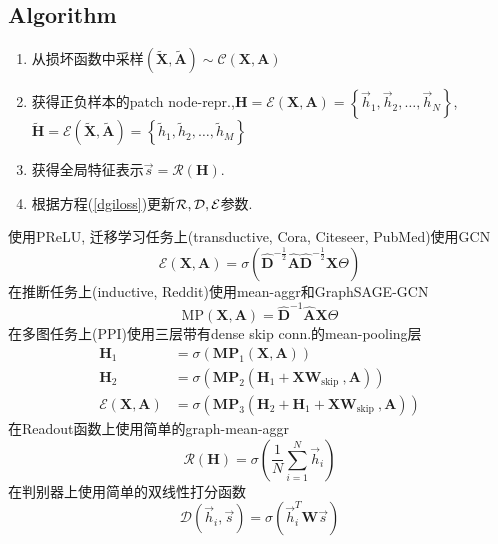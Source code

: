 \documentclass{article}
\begin{document}
\subsection{Algorithm}
    \begin{enumerate}
        \item 从损坏函数中采样$(\tilde{\mathbf{X}}, \widetilde{\mathbf{A}}) \sim \mathcal{C}(\mathbf{X}, \mathbf{A})$
        \item 获得正负样本的patch node-repr.,$\mathbf{H}=\mathcal{E}(\mathbf{X}, \mathbf{A})=\left\{\vec{h}_{1}, \vec{h}_{2}, \ldots, \vec{h}_{N}\right\}$, $\tilde{\mathbf{H}}=\mathcal{E}(\tilde{\mathbf{X}}, \tilde{\mathbf{A}})=\left\{\widetilde{h}_{1}, \widetilde{h}_{2}, \ldots, \tilde{h}_{M}\right\}$
        \item 获得全局特征表示$\vec{s}=\mathcal{R}(\mathbf{H})$.
        \item 根据方程(\ref{dgiloss})更新$\cal{R, D, E}$参数.
    \end{enumerate}

    使用PReLU, 
    迁移学习任务上(transductive, Cora, Citeseer, PubMed)使用GCN
    \begin{equation}
        \mathcal{E}(\mathbf{X}, \mathbf{A})=\sigma\left(\hat{\mathbf{D}}^{-\frac{1}{2}} \hat{\mathbf{A}} \hat{\mathbf{D}}^{-\frac{1}{2}} \mathbf{X} \Theta\right)
    \end{equation}
    在推断任务上(inductive, Reddit)使用mean-aggr和GraphSAGE-GCN
    \begin{equation}
        \mathrm{MP}(\mathbf{X}, \mathbf{A})=\hat{\mathbf{D}}^{-1} \hat{\mathbf{A}} \mathbf{X} \Theta
    \end{equation}  
    在多图任务上(PPI)使用三层带有dense skip conn.的mean-pooling层
    \begin{equation}
        \begin{aligned}
        \mathbf{H}_{1} &=\sigma\left(\mathbf{M} \mathbf{P}_{1}(\mathbf{X}, \mathbf{A})\right) \\
        \mathbf{H}_{2} &=\sigma\left(\mathbf{M P}_{2}\left(\mathbf{H}_{1}+\mathbf{X} \mathbf{W}_{\text {skip }}, \mathbf{A}\right)\right) \\
        \mathcal{E}(\mathbf{X}, \mathbf{A}) &=\sigma\left(\mathbf{M P}_{3}\left(\mathbf{H}_{2}+\mathbf{H}_{1}+\mathbf{X} \mathbf{W}_{\text {skip }}, \mathbf{A}\right)\right)
        \end{aligned}
    \end{equation}
    在Readout函数上使用简单的graph-mean-aggr
    \begin{equation}
        \mathcal{R}(\mathbf{H})=\sigma\left(\frac{1}{N} \sum_{i=1}^{N} \vec{h}_{i}\right)
    \end{equation}
    在判别器上使用简单的双线性打分函数
    \begin{equation}
        \mathcal{D}\left(\vec{h}_{i}, \vec{s}\right)=\sigma\left(\vec{h}_{i}^{T} \mathbf{W} \vec{s}\right)
    \end{equation}
\end{document}
